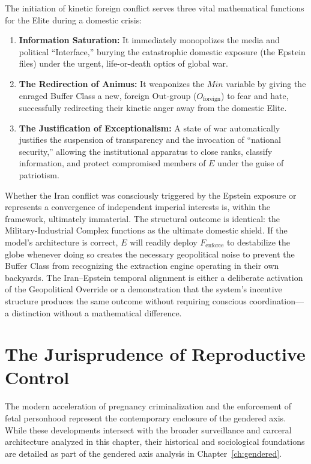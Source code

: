 The initiation of kinetic foreign conflict serves three vital mathematical functions for the Elite during a domestic crisis:

\begin{enumerate}
    \item \textbf{Information Saturation:} It immediately monopolizes the media and political ``Interface,'' burying the catastrophic domestic exposure (the Epstein files) under the urgent, life-or-death optics of global war.

    \item \textbf{The Redirection of Animus:} It weaponizes the $Min$ variable by giving the enraged Buffer Class a new, foreign Out-group ($O_{\text{foreign}}$) to fear and hate, successfully redirecting their kinetic anger away from the domestic Elite.

    \item \textbf{The Justification of Exceptionalism:} A state of war automatically justifies the suspension of transparency and the invocation of ``national security,'' allowing the institutional apparatus to close ranks, classify information, and protect compromised members of $E$ under the guise of patriotism.
\end{enumerate}

Whether the Iran conflict was consciously triggered by the Epstein exposure or represents a convergence of independent imperial interests is, within the framework, ultimately immaterial. The structural outcome is identical: the Military-Industrial Complex functions as the ultimate domestic shield. If the model's architecture is correct, $E$ will readily deploy $F_{\text{enforce}}$ to destabilize the globe whenever doing so creates the necessary geopolitical noise to prevent the Buffer Class from recognizing the extraction engine operating in their own backyards. The Iran--Epstein temporal alignment is either a deliberate activation of the Geopolitical Override or a demonstration that the system's incentive structure produces the same outcome without requiring conscious coordination---a distinction without a mathematical difference.

\section{The Jurisprudence of Reproductive Control}

The modern acceleration of pregnancy criminalization and the enforcement of fetal personhood represent the contemporary enclosure of the gendered axis. While these developments intersect with the broader surveillance and carceral architecture analyzed in this chapter, their historical and sociological foundations are detailed as part of the gendered axis analysis in Chapter~\ref{ch:gendered}.



